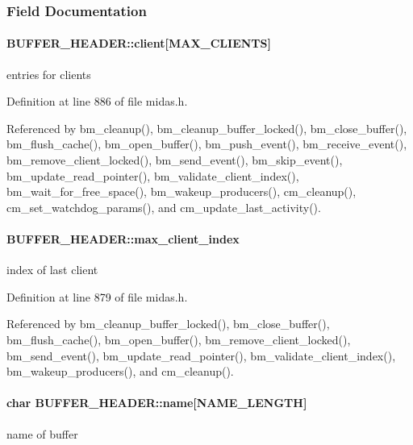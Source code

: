 \subsubsection{Field Documentation}
\paragraph[{client}]{ {\bf BUFFER\_\-HEADER::client}\mbox{[}MAX\_\-CLIENTS\mbox{]}}\hfill\label{structBUFFER__HEADER_a7bf4fa88ab9e4791b3357210c0422946}
entries for clients 

Definition at line 886 of file midas.h.

Referenced by bm\_\-cleanup(), bm\_\-cleanup\_\-buffer\_\-locked(), bm\_\-close\_\-buffer(), bm\_\-flush\_\-cache(), bm\_\-open\_\-buffer(), bm\_\-push\_\-event(), bm\_\-receive\_\-event(), bm\_\-remove\_\-client\_\-locked(), bm\_\-send\_\-event(), bm\_\-skip\_\-event(), bm\_\-update\_\-read\_\-pointer(), bm\_\-validate\_\-client\_\-index(), bm\_\-wait\_\-for\_\-free\_\-space(), bm\_\-wakeup\_\-producers(), cm\_\-cleanup(), cm\_\-set\_\-watchdog\_\-params(), and cm\_\-update\_\-last\_\-activity().
\paragraph[{max\_\-client\_\-index}]{ {\bf BUFFER\_\-HEADER::max\_\-client\_\-index}}\hfill\label{structBUFFER__HEADER_a5af9f52955602868b5b9161580fa810d}
index of last client 

Definition at line 879 of file midas.h.

Referenced by bm\_\-cleanup\_\-buffer\_\-locked(), bm\_\-close\_\-buffer(), bm\_\-flush\_\-cache(), bm\_\-open\_\-buffer(), bm\_\-remove\_\-client\_\-locked(), bm\_\-send\_\-event(), bm\_\-update\_\-read\_\-pointer(), bm\_\-validate\_\-client\_\-index(), bm\_\-wakeup\_\-producers(), and cm\_\-cleanup().
\paragraph[{name}]{\setlength{\rightskip}{0pt plus 5cm}char {\bf BUFFER\_\-HEADER::name}\mbox{[}NAME\_\-LENGTH\mbox{]}}\hfill\label{structBUFFER__HEADER_a40ea1b56ee55965c4d61e6da5ae57022}
name of buffer 

